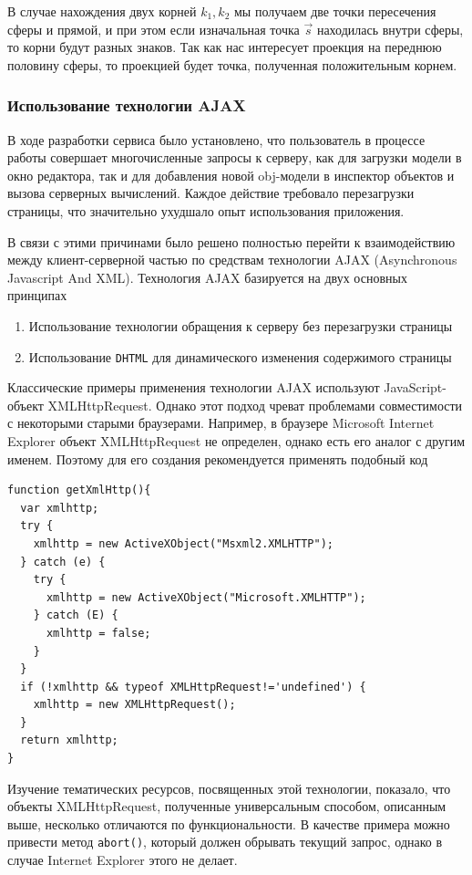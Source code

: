 \documentclass[14pt, a4paper]{extarticle}
\begin{document}
В случае нахождения двух корней $k_1, k_2$ мы получаем две точки пересечения
сферы и прямой, и при этом если изначальная точка $\vec{s}$ находилась внутри
сферы, то корни будут разных знаков. Так как нас интересует проекция на переднюю
половину сферы, то проекцией будет точка, полученная положительным корнем.

\subsubsection{Использование технологии AJAX}

В ходе разработки сервиса было установлено, что пользователь в процессе работы
совершает многочисленные запросы к серверу, как для загрузки модели в окно
редактора, так и для добавления новой obj-модели в инспектор объектов и вызова
серверных вычислений. Каждое действие требовало перезагрузки страницы, что
значительно ухудшало опыт использования приложения.

В связи с этими причинами было решено полностью перейти к взаимодействию между
клиент-серверной частью по средствам технологии AJAX (Asynchronous Javascript
And XML). Технология AJAX базируется на двух основных принципах

\begin{enumerate}
    \item Использование технологии обращения к серверу без перезагрузки страницы
    \item Использование \texttt{DHTML} для динамического изменения содержимого
    страницы
\end{enumerate}

Классические примеры применения технологии AJAX используют JavaScript-объект
XMLHttpRequest. Однако этот подход чреват проблемами совместимости с некоторыми
старыми браузерами. Например, в браузере Microsoft Internet Explorer объект
XMLHttpRequest не определен, однако есть его аналог с другим именем. Поэтому для
его создания рекомендуется применять подобный код

\begin{lstlisting}
function getXmlHttp(){
  var xmlhttp;
  try {
    xmlhttp = new ActiveXObject("Msxml2.XMLHTTP");
  } catch (e) {
    try {
      xmlhttp = new ActiveXObject("Microsoft.XMLHTTP");
    } catch (E) {
      xmlhttp = false;
    }
  }
  if (!xmlhttp && typeof XMLHttpRequest!='undefined') {
    xmlhttp = new XMLHttpRequest();
  }
  return xmlhttp;
}
\end{lstlisting}

Изучение тематических ресурсов, посвященных этой технологии, показало, что
объекты XMLHttpRequest, полученные универсальным способом, описанным выше,
несколько отличаются по функциональности. В качестве примера можно привести
метод \texttt{abort()}, который должен обрывать текущий запрос, однако в случае
Internet Explorer этого не делает.
\end{document}

